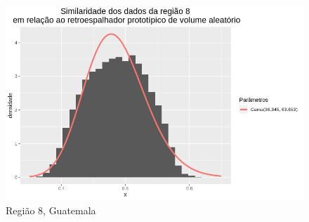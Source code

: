 \documentclass[12pt]{article}
\begin{document}
\begin{figure}[!h]
    \centering    
    \vspace{0.1\linewidth}
    \includegraphics[width = 0.95\linewidth]{../../Images/Report_18_12_17/rv_region8.png}
    \caption{Região 8, Guatemala}
    \label{fig:rv_r8}
\end{figure}

\newpage



\end{document}
